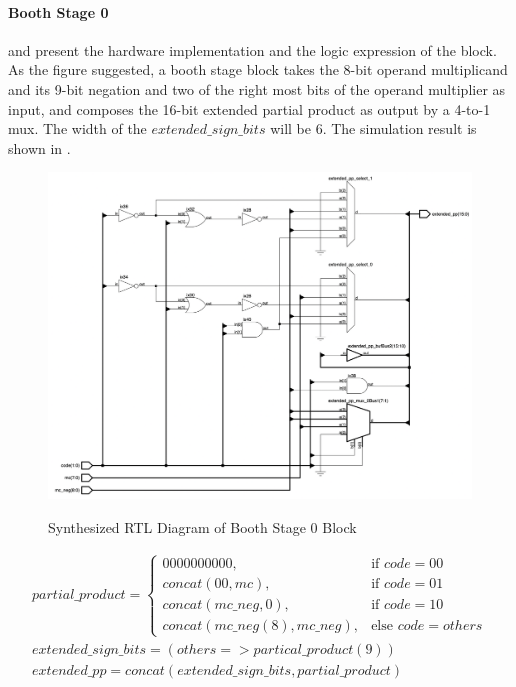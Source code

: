 \paragraph{Booth Stage 0}
 and  present the hardware implementation and the logic expression of the block.
As the figure suggested, a booth stage block takes the 8-bit operand multiplicand and its 9-bit negation and two of the right most bits of the operand multiplier
as input, and composes the 16-bit extended partial product as output by a 4-to-1 mux. The width of the \(extended\_sign\_bits\) will be 6.
The simulation result is shown in .

\begin{figure}[!ht]
	\centering
	\caption{Synthesized RTL Diagram of Booth Stage 0 Block}
	\includegraphics[width=\textwidth]{../img/booth_stage_0_rtl.png}
	\label{fig:booth_stage_0_rtl}
\end{figure}

\begin{equation}
	\begin{array}{c}
		partial\_product =
		\begin{cases}
			0000000000,                 & \text{if } code = 00       \\
			concat(00, mc),             & \text{if } code = 01       \\
			concat(mc\_neg, 0),         & \text{if } code = 10       \\
			concat(mc\_neg(8),mc\_neg), & \text{else } code = others
		\end{cases} \\
		extended\_sign\_bits = (others => partical\_product(9))  \\
		extended\_pp = concat(extended\_sign\_bits, partial\_product)
	\end{array}
	\label{exp:booth_stage_0}
\end{equation}

